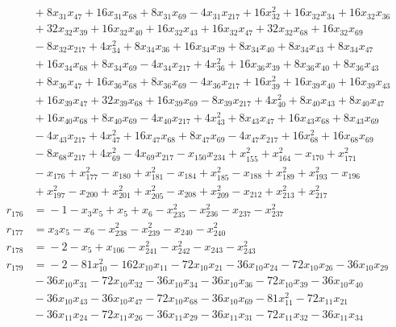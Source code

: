 \begin{align*}
&{}+8x_{31}x_{47} +16x_{31}x_{68} +8x_{31}x_{69} -4x_{31}x_{217} +16x_{32}^{2} +16x_{32}x_{34} +16x_{32}x_{36} \\
&{}+32x_{32}x_{39} +16x_{32}x_{40} +16x_{32}x_{43} +16x_{32}x_{47} +32x_{32}x_{68} +16x_{32}x_{69} \\
&{}-8x_{32}x_{217} +4x_{34}^{2} +8x_{34}x_{36} +16x_{34}x_{39} +8x_{34}x_{40} +8x_{34}x_{43} +8x_{34}x_{47} \\
&{}+16x_{34}x_{68} +8x_{34}x_{69} -4x_{34}x_{217} +4x_{36}^{2} +16x_{36}x_{39} +8x_{36}x_{40} +8x_{36}x_{43} \\
&{}+8x_{36}x_{47} +16x_{36}x_{68} +8x_{36}x_{69} -4x_{36}x_{217} +16x_{39}^{2} +16x_{39}x_{40} +16x_{39}x_{43} \\
&{}+16x_{39}x_{47} +32x_{39}x_{68} +16x_{39}x_{69} -8x_{39}x_{217} +4x_{40}^{2} +8x_{40}x_{43} +8x_{40}x_{47} \\
&{}+16x_{40}x_{68} +8x_{40}x_{69} -4x_{40}x_{217} +4x_{43}^{2} +8x_{43}x_{47} +16x_{43}x_{68} +8x_{43}x_{69} \\
&{}-4x_{43}x_{217} +4x_{47}^{2} +16x_{47}x_{68} +8x_{47}x_{69} -4x_{47}x_{217} +16x_{68}^{2} +16x_{68}x_{69} \\
&{}-8x_{68}x_{217} +4x_{69}^{2} -4x_{69}x_{217} -x_{150}x_{234} +x_{155}^{2} +x_{164}^{2} -x_{170} +x_{171}^{2} \\
&{}-x_{176} +x_{177}^{2} -x_{180} +x_{181}^{2} -x_{184} +x_{185}^{2} -x_{188} +x_{189}^{2} +x_{193}^{2} -x_{196} \\
&{}+x_{197}^{2} -x_{200} +x_{201}^{2} +x_{205}^{2} -x_{208} +x_{209}^{2} -x_{212} +x_{213}^{2} +x_{217}^{2} \\
r_{176} &={}-1 -x_{3}x_{5} +x_{5} +x_{6} -x_{235}^{2} -x_{236}^{2} -x_{237} -x_{237}^{2} \\
r_{177} &={}x_{3}x_{5} -x_{6} -x_{238}^{2} -x_{239}^{2} -x_{240} -x_{240}^{2} \\
r_{178} &={}-2 -x_{5} +x_{106} -x_{241}^{2} -x_{242}^{2} -x_{243} -x_{243}^{2} \\
r_{179} &={}-2 -81x_{10}^{2} -162x_{10}x_{11} -72x_{10}x_{21} -36x_{10}x_{24} -72x_{10}x_{26} -36x_{10}x_{29} \\
&{}-36x_{10}x_{31} -72x_{10}x_{32} -36x_{10}x_{34} -36x_{10}x_{36} -72x_{10}x_{39} -36x_{10}x_{40} \\
&{}-36x_{10}x_{43} -36x_{10}x_{47} -72x_{10}x_{68} -36x_{10}x_{69} -81x_{11}^{2} -72x_{11}x_{21} \\
&{}-36x_{11}x_{24} -72x_{11}x_{26} -36x_{11}x_{29} -36x_{11}x_{31} -72x_{11}x_{32} -36x_{11}x_{34} \\

\end{align*}
